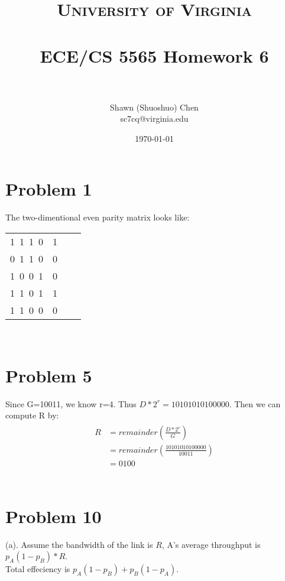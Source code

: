 \documentclass[titlepage, paper=a4, fontsize=11pt]{scrartcl} %
\title{	
\normalfont \normalsize 
\textsc{University of Virginia} \\ [25pt] %
\horrule{0.5pt} \\[0.4cm] %
\huge ECE/CS 5565 Homework 6 \\ %
\horrule{2pt} \\[0.5cm] %
}
\author{Shawn (Shuoshuo) Chen\\sc7cq@virginia.edu} %
\date{\normalsize\today} %
\numberwithin{equation}{section} %
\numberwithin{table}{section} %
\begin{document}
\maketitle %


\section*{Problem 1}
The two-dimentional even parity matrix looks like:
\begin{tabular}{ r | r | r | r }
  1\ 1\ 1\ 0 & 1 \\
  0\ 1\ 1\ 0 & 0 \\
  1\ 0\ 0\ 1 & 0 \\
  1\ 1\ 0\ 1 & 1 \\
  \hline
  1\ 1\ 0\ 0 & 0 \\
\end{tabular}
\\




\section*{Problem 5}
Since G=10011, we know r=4. Thus $D*2^r=10101010100000$. Then we can compute R by:
\begin{align*} 
\begin{split}
R&=remainder(\frac{D*2^r}{G}) \\
&= remainder(\frac{10101010100000}{10011}) \\
&= 0100
\end{split}					
\end{align*}
\\




\section*{Problem 10}
(a).
Assume the bandwidth of the link is $R$, A's average throughput is $p_A(1-p_B)*R$. \\
Total effeciency is $p_A(1-p_B)+p_B(1-p_A)$. \\
\end{document}

